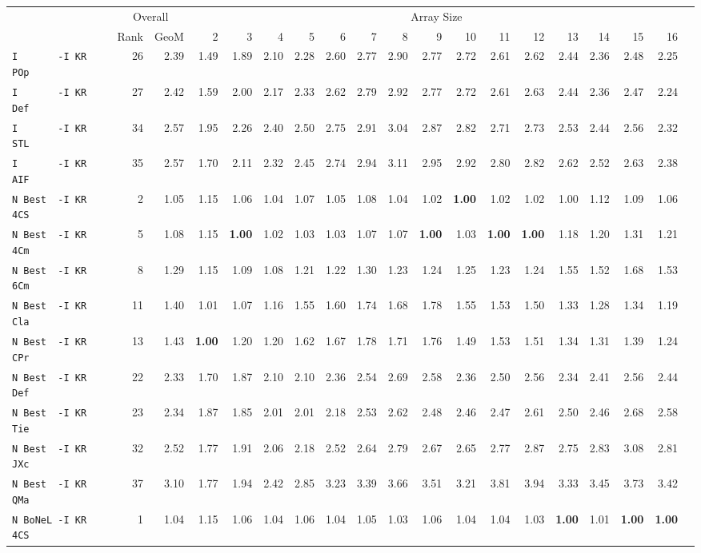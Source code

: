 \begin{tabular}{l | r @{~~} r | r@{~~}r@{~~}r@{~~}r@{~~}r@{~~}r@{~~}r@{~~}r@{~~}r@{~~}r@{~~}r@{~~}r@{~~}r@{~~}r@{~~}r@{~~}r|}
 & \multicolumn{2}{c|}{Overall} & \multicolumn{15}{c}{Array Size} \\
 & Rank & GeoM & 2&3&4&5&6&7&8&9&10&11&12&13&14&15&16\\ \hline
\verb+I       -I KR POp+ & 26 & 2.39 & 1.49&1.89&2.10&2.28&2.60&2.77&2.90&2.77&2.72&2.61&2.62&2.44&2.36&2.48&2.25\\
\verb+I       -I KR Def+ & 27 & 2.42 & 1.59&2.00&2.17&2.33&2.62&2.79&2.92&2.77&2.72&2.61&2.63&2.44&2.36&2.47&2.24\\
\verb+I       -I KR STL+ & 34 & 2.57 & 1.95&2.26&2.40&2.50&2.75&2.91&3.04&2.87&2.82&2.71&2.73&2.53&2.44&2.56&2.32\\
\verb+I       -I KR AIF+ & 35 & 2.57 & 1.70&2.11&2.32&2.45&2.74&2.94&3.11&2.95&2.92&2.80&2.82&2.62&2.52&2.63&2.38\smallskip \\
\verb+N Best  -I KR 4CS+ & 2 & 1.05 & 1.15&1.06&1.04&1.07&1.05&1.08&1.04&1.02&\textbf{1.00}&1.02&1.02&1.00&1.12&1.09&1.06\\
\verb+N Best  -I KR 4Cm+ & 5 & 1.08 & 1.15&\textbf{1.00}&1.02&1.03&1.03&1.07&1.07&\textbf{1.00}&1.03&\textbf{1.00}&\textbf{1.00}&1.18&1.20&1.31&1.21\\
\verb+N Best  -I KR 6Cm+ & 8 & 1.29 & 1.15&1.09&1.08&1.21&1.22&1.30&1.23&1.24&1.25&1.23&1.24&1.55&1.52&1.68&1.53\\
\verb+N Best  -I KR Cla+ & 11 & 1.40 & 1.01&1.07&1.16&1.55&1.60&1.74&1.68&1.78&1.55&1.53&1.50&1.33&1.28&1.34&1.19\\
\verb+N Best  -I KR CPr+ & 13 & 1.43 & \textbf{1.00}&1.20&1.20&1.62&1.67&1.78&1.71&1.76&1.49&1.53&1.51&1.34&1.31&1.39&1.24\\
\verb+N Best  -I KR Def+ & 22 & 2.33 & 1.70&1.87&2.10&2.10&2.36&2.54&2.69&2.58&2.36&2.50&2.56&2.34&2.41&2.56&2.44\\
\verb+N Best  -I KR Tie+ & 23 & 2.34 & 1.87&1.85&2.01&2.01&2.18&2.53&2.62&2.48&2.46&2.47&2.61&2.50&2.46&2.68&2.58\\
\verb+N Best  -I KR JXc+ & 32 & 2.52 & 1.77&1.91&2.06&2.18&2.52&2.64&2.79&2.67&2.65&2.77&2.87&2.75&2.83&3.08&2.81\\
\verb+N Best  -I KR QMa+ & 37 & 3.10 & 1.77&1.94&2.42&2.85&3.23&3.39&3.66&3.51&3.21&3.81&3.94&3.33&3.45&3.73&3.42\smallskip \\
\verb+N BoNeL -I KR 4CS+ & 1 & 1.04 & 1.15&1.06&1.04&1.06&1.04&1.05&1.03&1.06&1.04&1.04&1.03&\textbf{1.00}&1.01&\textbf{1.00}&\textbf{1.00}\\

\end{tabular}
